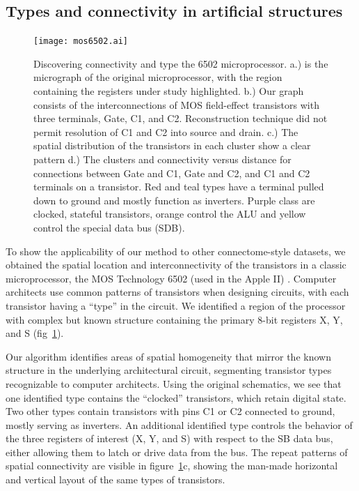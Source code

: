 \documentclass{article}
\begin{document}
\subsection*{Types and connectivity in artificial structures}
\begin{figure}
  \centering 
  \centerline{\texttt{[image: mos6502.ai]}}
  \caption{Discovering connectivity and type the 6502 microprocessor.
    a.) is the micrograph of the original microprocessor, with the
    region containing the registers under study highlighted. b.) Our
    graph consists of the interconnections of MOS field-effect
    transistors with three terminals, Gate, C1, and C2. Reconstruction
    technique did not permit resolution of C1 and C2 into source and
    drain. c.) The spatial distribution of the transistors in each
    cluster show a clear pattern d.) The clusters and connectivity
    versus distance for connections between Gate and C1, Gate and C2,
    and C1 and C2 terminals on a transistor. Red and teal types have a
    terminal pulled down to ground and mostly function as
    inverters. Purple class are clocked, stateful transistors, orange
    control the ALU and yellow control the special data bus (SDB).}
  \label{fig:mos6502}
\end{figure}


To show the applicability of our method to other connectome-style
datasets, we obtained the spatial location and interconnectivity of
the transistors in a classic microprocessor, the MOS Technology 6502
(used in the Apple II) \autocite{James2010}. Computer architects use
common patterns of transistors when designing circuits, with each
transistor having a ``type'' in the circuit. We identified a region of
the processor with complex but known structure containing the primary
8-bit registers X, Y, and S (fig~\ref{fig:mos6502}).

Our algorithm identifies areas of spatial homogeneity that mirror the
known structure in the underlying architectural circuit, segmenting
transistor types recognizable to computer architects. Using the
original schematics, we see that one identified type contains the
``clocked'' transistors, which retain digital state. Two other types
contain transistors with pins C1 or C2 connected to ground, mostly
serving as inverters.  An additional identified type controls the
behavior of the three registers of interest (X, Y, and S) with respect
to the SB data bus, either allowing them to latch or drive data from
the bus. The repeat patterns of spatial connectivity are visible in
figure~\ref{fig:mos6502}c, showing the man-made horizontal and
vertical layout of the same types of transistors.
\end{document}

